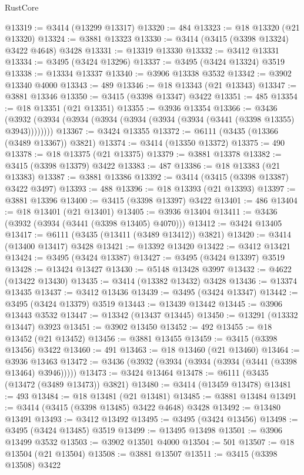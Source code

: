 \begin{lexlean}{RustCore}
\begin{coremodule}
@13319 := @3414 (@13299 @13317)
@13320 := 484
@13323 := @18 @13320 (@21 @13320)
@13324 := @3881 @13323
@13330 := @3414 (@3415 (@3398 @13324) @3422 @4648) @3428
@13331 := @13319 @13330
@13332 := @3412 @13331
@13334 := @3495 (@3424 @13296)
@13337 := @3495 (@3424 @13324) @3519
@13338 := @13334 @13337
@13340 := @3906 @13338 @3532
@13342 := @3902 @13340 @4000
@13343 := 489
@13346 := @18 @13343 (@21 @13343)
@13347 := @3881 @13346
@13350 := @3415 (@3398 @13347) @3422
@13351 := 485
@13354 := @18 @13351 (@21 @13351)
@13355 := @3936 @13354
@13366 := @3436 (@3932 (@3934 (@3934 (@3934 (@3934 (@3934 (@3934 (@3441 (@3398 @13355) @3943))))))))
@13367 := @3424 @13355
@13372 := @6111 (@3435 (@13366 (@3489 @13367)) @3821)
@13374 := @3414 (@13350 @13372)
@13375 := 490
@13378 := @18 @13375 (@21 @13375)
@13379 := @3881 @13378
@13382 := @3415 (@3398 @13379) @3422
@13383 := 487
@13386 := @18 @13383 (@21 @13383)
@13387 := @3881 @13386
@13392 := @3414 (@3415 (@3398 @13387) @3422 @3497)
@13393 := 488
@13396 := @18 @13393 (@21 @13393)
@13397 := @3881 @13396
@13400 := @3415 (@3398 @13397) @3422
@13401 := 486
@13404 := @18 @13401 (@21 @13401)
@13405 := @3936 @13404
@13411 := @3436 (@3932 (@3934 (@3441 (@3398 @13405) @4070)))
@13412 := @3424 @13405
@13417 := @6111 (@3435 (@13411 (@3489 @13412)) @3821)
@13420 := @3414 (@13400 @13417) @3428
@13421 := @13392 @13420
@13422 := @3412 @13421
@13424 := @3495 (@3424 @13387)
@13427 := @3495 (@3424 @13397) @3519
@13428 := @13424 @13427
@13430 := @5148 @13428 @3997
@13432 := @4622 (@13422 @13430)
@13435 := @3414 (@13382 @13432) @3428
@13436 := @13374 @13435
@13437 := @3412 @13436
@13439 := @3495 (@3424 @13347)
@13442 := @3495 (@3424 @13379) @3519
@13443 := @13439 @13442
@13445 := @3906 @13443 @3532
@13447 := @13342 (@13437 @13445)
@13450 := @13291 (@13332 @13447) @3923
@13451 := @3902 @13450
@13452 := 492
@13455 := @18 @13452 (@21 @13452)
@13456 := @3881 @13455
@13459 := @3415 (@3398 @13456) @3422
@13460 := 491
@13463 := @18 @13460 (@21 @13460)
@13464 := @3936 @13463
@13472 := @3436 (@3932 (@3934 (@3934 (@3934 (@3441 (@3398 @13464) @3946)))))
@13473 := @3424 @13464
@13478 := @6111 (@3435 (@13472 (@3489 @13473)) @3821)
@13480 := @3414 (@13459 @13478)
@13481 := 493
@13484 := @18 @13481 (@21 @13481)
@13485 := @3881 @13484
@13491 := @3414 (@3415 (@3398 @13485) @3422 @4648) @3428
@13492 := @13480 @13491
@13493 := @3412 @13492
@13495 := @3495 (@3424 @13456)
@13498 := @3495 (@3424 @13485) @3519
@13499 := @13495 @13498
@13501 := @3906 @13499 @3532
@13503 := @3902 @13501 @4000
@13504 := 501
@13507 := @18 @13504 (@21 @13504)
@13508 := @3881 @13507
@13511 := @3415 (@3398 @13508) @3422

\end{coremodule}
\end{lexlean}
